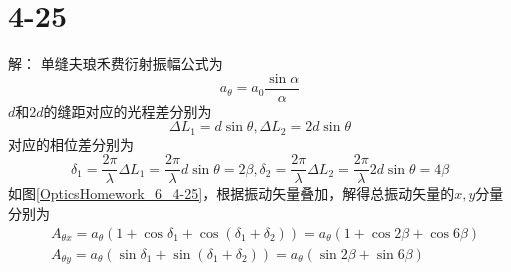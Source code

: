\documentclass[10pt,a4paper]{article}
\begin{document}
\section*{4-25}解：
单缝夫琅禾费衍射振幅公式为
\[
a_{\theta}=a_0\frac{\sin\alpha}{\alpha}
\]
$d$和$2d$的缝距对应的光程差分别为
\[
\Delta L_1=d\sin\theta, \Delta L_2=2d\sin\theta
\]
对应的相位差分别为
\[
\delta_1=\frac{2\pi}{\lambda}\Delta L_1=\frac{2\pi}{\lambda}d\sin\theta=2\beta, \delta_2=\frac{2\pi}{\lambda}\Delta L_2=\frac{2\pi}{\lambda}2d\sin\theta=4\beta
\]
如图\ref{OpticsHomework_6_4-25}，根据振动矢量叠加，解得总振动矢量的$x,y$分量分别为
\begin{align*}
&A_{\theta x}=a_{\theta}(1+\cos\delta_1+\cos(\delta_1+\delta_2))=a_{\theta}(1+\cos2\beta+\cos6\beta)\\
&A_{\theta y}=a_{\theta}(\sin\delta_1+\sin(\delta_1+\delta_2))=a_{\theta}(\sin2\beta+\sin6\beta)
\end{align*}
\end{document}
